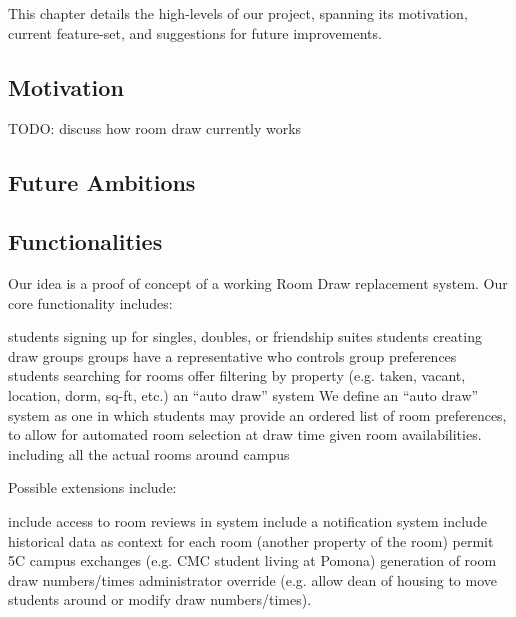 This chapter details the high-levels of our project, spanning its motivation,
current feature-set, and suggestions for future improvements.

\subsection{Motivation}

TODO: discuss how room draw currently works

\subsection{Future Ambitions}



\subsection{Functionalities}

Our idea is a proof of concept of a working Room Draw replacement system. Our
core functionality includes:

\begin{outline}
\1 students signing up for singles, doubles, or friendship suites
\1 students creating draw groups
    \2 groups have a representative who controls group preferences
\1 students searching for rooms
    \2 offer filtering by property (e.g. taken, vacant, location, dorm, sq-ft,
    etc.)
\1 an ``auto draw'' system
    \2 We define an ``auto draw'' system as one in which students may provide an
    ordered list of room preferences, to allow for automated room selection at
    draw time given room availabilities.
\1 including all the actual rooms around campus
\end{outline}

Possible extensions include:

\begin{outline}
\1 include access to room reviews in system
\1 include a notification system
\1 include historical data as context for each room (another property of the
    room)
\1 permit 5C campus exchanges (e.g. CMC student living at Pomona)
\1 generation of room draw numbers/times
\1 administrator override (e.g. allow dean of housing to move students around or modify
    draw numbers/times).
\end{outline}